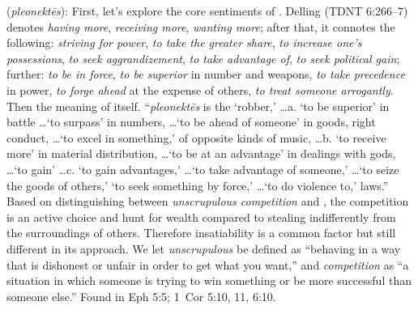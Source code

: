 \item[Unscrupulous competition,]

(\textit{pleonektēs}):
First, let's explore the core sentiments of . Delling (TDNT 6:266--7) denotes \emph{having more}, \emph{receiving more}, \emph{wanting more}; after that, it connotes the following: \emph{striving for power}, \emph{to take the greater share}, \emph{to increase one's possessions}, \emph{to seek aggrandizement}, \emph{to take advantage of}, \emph{to seek political gain}; further: \emph{to be in force}, \emph{to be superior} in number and weapons, \emph{to take precedence} in power, \emph{to forge ahead} at the expense of others, \emph{to treat someone arrogantly}.\\Then the meaning of  itself. ``\emph{pleonektēs} is the `robber,' \ldots a. `to be superior' in battle \ldots `to surpass' in numbers, \ldots `to be ahead of someone' in goods, right conduct, \ldots `to excel in something,' of opposite kinds of music, \ldots b. `to receive more' in material distribution, \ldots `to be at an advantage' in dealings with gods, \ldots `to gain' \ldots c. `to gain advantages,' \ldots `to take advantage of someone,' \ldots `to seize the goods of others,' `to seek something by force,' \ldots `to do violence to,' laws.'' Based on distinguishing between \emph{unscrupulous competition} and , the competition is an active choice and hunt for wealth compared to stealing indifferently from the surroundings of others. Therefore insatiability is a common factor but still different in its approach. We let \emph{unscrupulous} be defined as ``behaving in a way that is dishonest or unfair in order to get what you want,'' and \emph{competition} as ``a situation in which someone is trying to win something or be more successful than someone else.''
Found in Eph 5:5; 1~Cor 5:10, 11, 6:10.
